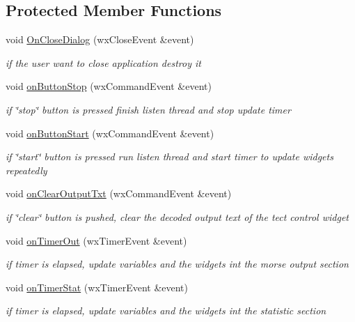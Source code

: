 \subsection*{Protected Member Functions}
\begin{DoxyCompactItemize}
\item 
void \hyperlink{classMainDialog_a17fec54d5486bc4e44052bcef47f3fcc}{On\+Close\+Dialog} (wx\+Close\+Event \&event)
\begin{DoxyCompactList}\small\item\em if the user want to close application destroy it \end{DoxyCompactList}\item 
void \hyperlink{classMainDialog_a505dcb8188eafd19d3fe21b382ec7fe7}{on\+Button\+Stop} (wx\+Command\+Event \&event)
\begin{DoxyCompactList}\small\item\em if \char`\"{}stop\char`\"{} button is pressed finish listen thread and stop update timer \end{DoxyCompactList}\item 
void \hyperlink{classMainDialog_a4feedd725b68a028c72c2227c4c55976}{on\+Button\+Start} (wx\+Command\+Event \&event)
\begin{DoxyCompactList}\small\item\em if \char`\"{}start\char`\"{} button is pressed run listen thread and start timer to update widgets repeatedly \end{DoxyCompactList}\item 
void \hyperlink{classMainDialog_a121d263ec1ae91147a8947dad64b984f}{on\+Clear\+Output\+Txt} (wx\+Command\+Event \&event)
\begin{DoxyCompactList}\small\item\em if \char`\"{}clear\char`\"{} button is pushed, clear the decoded output text of the tect control widget \end{DoxyCompactList}\item 
void \hyperlink{classMainDialog_a562ef211b7cfd5ae24a9f04f41ccb67e}{on\+Timer\+Out} (wx\+Timer\+Event \&event)
\begin{DoxyCompactList}\small\item\em if timer is elapsed, update variables and the widgets int the morse output section \end{DoxyCompactList}\item 
void \hyperlink{classMainDialog_a2b15d3ae06d0b3e1246bcd012f8f758a}{on\+Timer\+Stat} (wx\+Timer\+Event \&event)
\begin{DoxyCompactList}\small\item\em if timer is elapsed, update variables and the widgets int the statistic section \end{DoxyCompactList}\item 

\end{DoxyCompactItemize}
